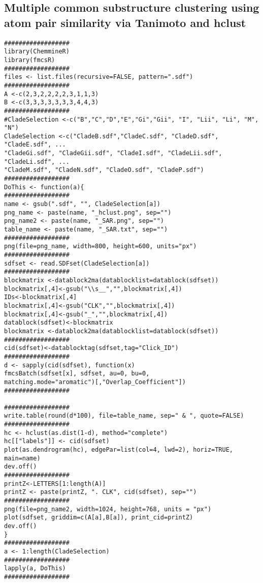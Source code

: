 \subsection{Multiple common substructure clustering using atom pair similarity via Tanimoto and hclust}

\begin{verbatim}
##################
library(ChemmineR)
library(fmcsR)
##################
files <- list.files(recursive=FALSE, pattern=".sdf")
##################
A <-c(2,3,2,2,2,2,3,1,1,3)
B <-c(3,3,3,3,3,3,3,4,4,3)
##################
#CladeSelection <-c("B","C","D","E","Gi","Gii", "I", "Lii", "Li", "M", "N")
CladeSelection <-c("CladeB.sdf","CladeC.sdf", "CladeD.sdf", "CladeE.sdf", ...
"CladeGi.sdf", "CladeGii.sdf", "CladeI.sdf", "CladeLii.sdf", "CladeLi.sdf", ...
"CladeM.sdf", "CladeN.sdf", "CladeO.sdf", "CladeP.sdf")
##################  	  
DoThis <- function(a){
##################
name <- gsub(".sdf", "", CladeSelection[a])
png_name <- paste(name, "_hclust.png", sep="")
png_name2 <- paste(name, "_SAR.png", sep="")
table_name <- paste(name, "_SAR.txt", sep="")
##################
png(file=png_name, width=800, height=600, units="px")
##################
sdfset <- read.SDFset(CladeSelection[a])
##################
blockmatrix <-datablock2ma(datablocklist=datablock(sdfset))
blockmatrix[,4]<-gsub("\\s__","",blockmatrix[,4])
IDs<-blockmatrix[,4]
blockmatrix[,4]<-gsub("CLK","",blockmatrix[,4])
blockmatrix[,4]<-gsub("_","",blockmatrix[,4])
datablock(sdfset)<-blockmatrix
blockmatrix <-datablock2ma(datablocklist=datablock(sdfset))
##################
cid(sdfset)<-datablocktag(sdfset,tag="Click_ID")
##################
d <- sapply(cid(sdfset), function(x)
fmcsBatch(sdfset[x], sdfset, au=0, bu=0,
matching.mode="aromatic")[,"Overlap_Coefficient"])
##################

##################
write.table(round(d*100), file=table_name, sep=" & ", quote=FALSE)
##################
hc <- hclust(as.dist(1-d), method="complete")
hc[["labels"]] <- cid(sdfset)
plot(as.dendrogram(hc), edgePar=list(col=4, lwd=2), horiz=TRUE, main=name)
dev.off()
##################
printZ<-LETTERS[1:length(A)]
printZ <- paste(printZ, ". CLK", cid(sdfset), sep="")
##################
png(file=png_name2, width=1024, height=768, units = "px")
plot(sdfset, griddim=c(A[a],B[a]), print_cid=printZ)
dev.off()
}
##################
a <- 1:length(CladeSelection)
##################
lapply(a, DoThis)
##################
\end{verbatim}

